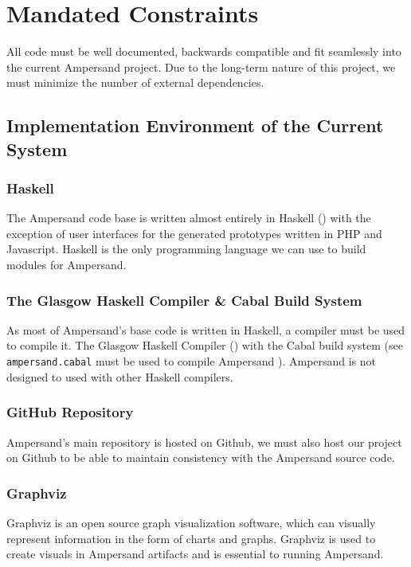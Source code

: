 \documentclass[12pt]{report}
\begin{document}
\section{Mandated Constraints}\label{sec:Constraints}

All code must be well documented, backwards compatible and fit seamlessly into 
the current Ampersand project. Due to the long-term nature of this project, we 
must minimize the number of external dependencies. 

\subsection{Implementation Environment of the Current System}
\subsubsection*{Haskell}
The Ampersand code base is written almost entirely in Haskell 
(\cite{ampSource}) with the exception of user interfaces for the generated 
prototypes written in PHP and Javascript. Haskell is the only programming 
language we can use to build modules for Ampersand.


\subsubsection*{The Glasgow Haskell Compiler \& Cabal Build System}
As most of Ampersand's base code is written in Haskell, a compiler must be used 
to compile it. The Glasgow Haskell Compiler (\cite{GHC}) with the Cabal build 
system (see \verb|ampersand.cabal| must be used to compile Ampersand 
\cite{ampSource}). Ampersand is not designed to used with other Haskell 
compilers.


\subsubsection*{GitHub Repository}
Ampersand's main repository is hosted on Github, we must also host our project 
on Github to be able to maintain consistency with the Ampersand source code.

\subsubsection*{Graphviz}
Graphviz is an open source graph visualization software, which can
visually represent information in the form of charts and graphs. Graphviz is 
used to create visuals in Ampersand artifacts and is essential to running 
Ampersand.
\end{document}
